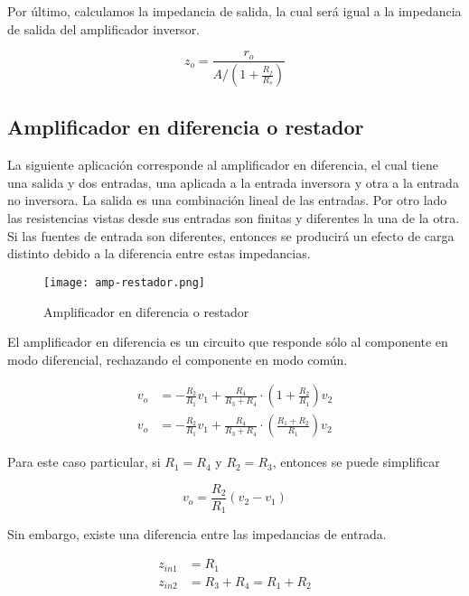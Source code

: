 Por último, calculamos la impedancia de salida, la cual será igual a la
impedancia de salida del amplificador inversor.

\begin{equation}
\boxed{z_o = \frac{r_o}{A / \left( 1 + \frac{R_f}{R_s} \right)}}
\end{equation}


\subsection{Amplificador en diferencia o restador}

La siguiente aplicación corresponde al amplificador en diferencia, el cual
tiene una salida y dos entradas, una aplicada a la entrada inversora y otra a la
entrada no inversora. La salida es una combinación lineal de las entradas. Por
otro lado las resistencias vistas desde sus entradas son finitas y diferentes la
una de la otra. Si las fuentes de entrada son diferentes, entonces se producirá
un efecto de carga distinto debido a la diferencia entre estas impedancias.

\begin{figure}[ht]
    \centering
    \texttt{[image: amp-restador.png]}
    \caption{Amplificador en diferencia o restador}
    \label{fig:mt-amp-restador}
\end{figure}

El amplificador en diferencia es un circuito que responde sólo al componente en modo diferencial, rechazando el componente en modo común.

\begin{align*}
v_o &= -\frac{R_2}{R_1} v_1 + \frac{R_4}{R_3 + R_4} \cdot \left( 1 + \frac{R_2}{R_1} \right) v_2 \\
v_o &= -\frac{R_2}{R_1} v_1 + \frac{R_4}{R_3 + R_4} \cdot \left( \frac{R_1 + R_2}{R_1} \right) v_2
\end{align*}

Para este caso particular, si $R_1 = R_4$ y $R_2 = R_3$, entonces se puede
simplificar

\begin{equation}
    \boxed{v_o = \frac{R_2}{R_1} (v_2 - v_1)}
    \label{eq:mt-ganancia-restador}
\end{equation}

Sin embargo, existe una diferencia entre las impedancias de entrada.

\begin{align*}
z_{in1} &= R_1 \\
z_{in2} &= R_3 + R_4 = R_1 + R_2
\end{align*}


